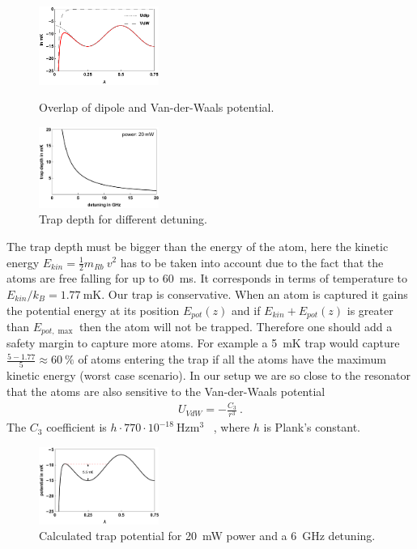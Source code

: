 \begin{figure}
    \includegraphics[width=0.35\textwidth]{potentialoverlap}    
    \caption{\label{fig:potentialoverlap} Overlap of dipole and Van-der-Waals 
    potential.}
    \vspace{2em}
    \includegraphics[width=0.35\textwidth]{detuningopt}    
    \caption{\label{fig:detuningopt} Trap depth for different detuning.}
\end{figure}

The trap depth must be bigger than the energy of the atom, here the kinetic energy 
\(E_{kin} = \frac{1}{2}m_{Rb}~v^2 \) has to be taken into account due to the fact 
that the atoms are free falling for up to \SI{60}{\milli\second}. It corresponds 
in terms of temperature to \(E_{kin}/k_B = \SI{1.77}{\milli\kelvin} \). Our trap 
is conservative. When an atom is captured it gains the potential energy at its
position \(E_{pot}(z) \) and if \(E_{kin} + E_{pot}(z) \) is greater than \(E_{pot,\max}\) 
then the atom will not be trapped. Therefore one should add a safety margin to 
capture more atoms. For example a \SI{5}{\milli\kelvin} trap would capture 
\(\frac{5-1.77}{5} \approx \SI{60}{\percent} \) of atoms entering the trap if all
the atoms have the maximum kinetic energy (worst case scenario). In our setup we 
are so close to the resonator that the atoms are also sensitive to the Van-der-Waals 
potential~\cite{PhysRevA.89.022511}
\begin{align}
    U_{VdW} = -\frac{C_3}{r^3}~.
\end{align} 
The \(C_3\) coefficient is \( h\cdot770\cdot10^{-18}~\si{\hertz\meter\cubed}\)
~\cite{OsheaPHD}, where \(h\) is Plank's constant.

\begin{figure}
    \includegraphics[width=0.35\textwidth]{trapdepth}    
    \caption{\label{fig:trapdepth} Calculated trap potential for \SI{20}{\milli\watt}
     power and a \SI{6}{\giga\hertz} detuning.}
\end{figure}

